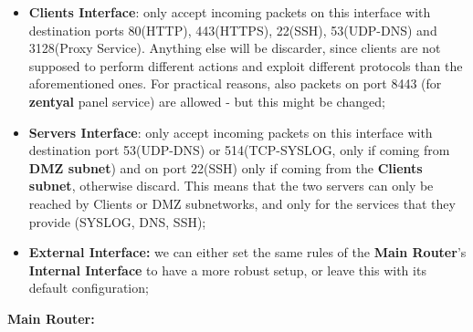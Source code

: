 \begin{itemize}
\item \textbf{Clients Interface}: only accept incoming packets on this interface with destination ports 80(HTTP), 443(HTTPS), 22(SSH), 53(UDP-DNS) and 3128(Proxy Service). Anything else will be discarder, since clients are not supposed to perform different actions and exploit different protocols than the aforementioned ones. For practical reasons, also packets on port 8443 (for \textbf{zentyal} panel service) are allowed - but this might be changed;
\item \textbf{Servers Interface}: only accept incoming packets on this interface with destination port 53(UDP-DNS) or 514(TCP-SYSLOG, only if coming from \textbf{DMZ subnet}) and on port 22(SSH) only if coming from the \textbf{Clients subnet}, otherwise discard. This means that the two servers can only be reached by Clients or DMZ subnetworks, and only for the services that they provide (SYSLOG, DNS, SSH);
\item \textbf{External Interface:} we can either set the same rules of the \textbf{Main Router}'s \textbf{Internal Interface} to have a more robust setup, or leave this with its default configuration;
\end{itemize}
\textbf{Main Router:}
